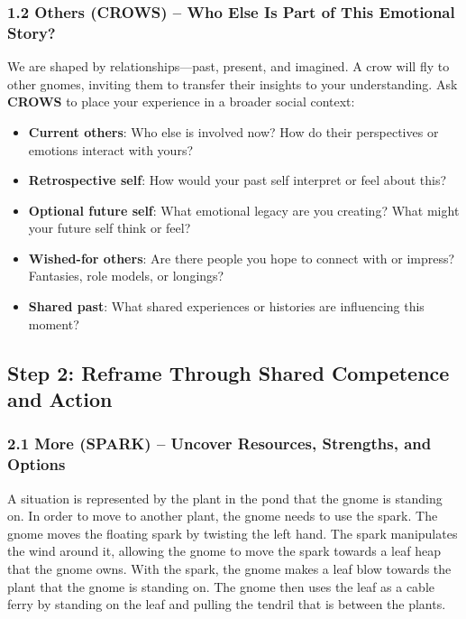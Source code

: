 \documentclass{article}
\begin{document}
\subsubsection{1.2 Others (CROWS) – Who Else Is Part of This Emotional Story?}
We are shaped by relationships—past, present, and imagined. A crow will fly to other gnomes, inviting them to transfer their insights to your understanding. Ask \textbf{CROWS} to place your experience in a broader social context:
\begin{itemize}[noitemsep,topsep=0pt]
    \item \textbf{Current others}: Who else is involved now? How do their perspectives or emotions interact with yours?
    \item \textbf{Retrospective self}: How would your past self interpret or feel about this?
    \item \textbf{Optional future self}: What emotional legacy are you creating? What might your future self think or feel?
    \item \textbf{Wished-for others}: Are there people you hope to connect with or impress? Fantasies, role models, or longings?
    \item \textbf{Shared past}: What shared experiences or histories are influencing this moment?
\end{itemize}

\subsection{Step 2: Reframe Through Shared Competence and Action}

\subsubsection{2.1 More (SPARK) – Uncover Resources, Strengths, and Options}
A situation is represented by the plant in the pond that the gnome is standing on. In order to move to another plant, the gnome needs to use the spark. The gnome moves the floating spark by twisting the left hand. The spark manipulates the wind around it, allowing the gnome to move the spark towards a leaf heap that the gnome owns. With the spark, the gnome makes a leaf blow towards the plant that the gnome is standing on. The gnome then uses the leaf as a cable ferry by standing on the leaf and pulling the tendril that is between the plants.
\end{document}
